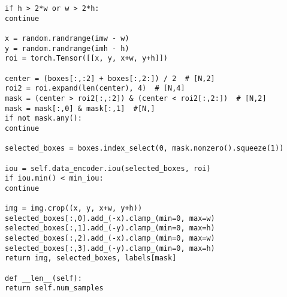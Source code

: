 \begin{lstlisting}[caption={datagen.py}]
if h > 2*w or w > 2*h:
continue

x = random.randrange(imw - w)
y = random.randrange(imh - h)
roi = torch.Tensor([[x, y, x+w, y+h]])

center = (boxes[:,:2] + boxes[:,2:]) / 2  # [N,2]
roi2 = roi.expand(len(center), 4)  # [N,4]
mask = (center > roi2[:,:2]) & (center < roi2[:,2:])  # [N,2]
mask = mask[:,0] & mask[:,1]  #[N,]
if not mask.any():
continue

selected_boxes = boxes.index_select(0, mask.nonzero().squeeze(1))

iou = self.data_encoder.iou(selected_boxes, roi)
if iou.min() < min_iou:
continue

img = img.crop((x, y, x+w, y+h))
selected_boxes[:,0].add_(-x).clamp_(min=0, max=w)
selected_boxes[:,1].add_(-y).clamp_(min=0, max=h)
selected_boxes[:,2].add_(-x).clamp_(min=0, max=w)
selected_boxes[:,3].add_(-y).clamp_(min=0, max=h)
return img, selected_boxes, labels[mask]

def __len__(self):
return self.num_samples
\end{lstlisting}
